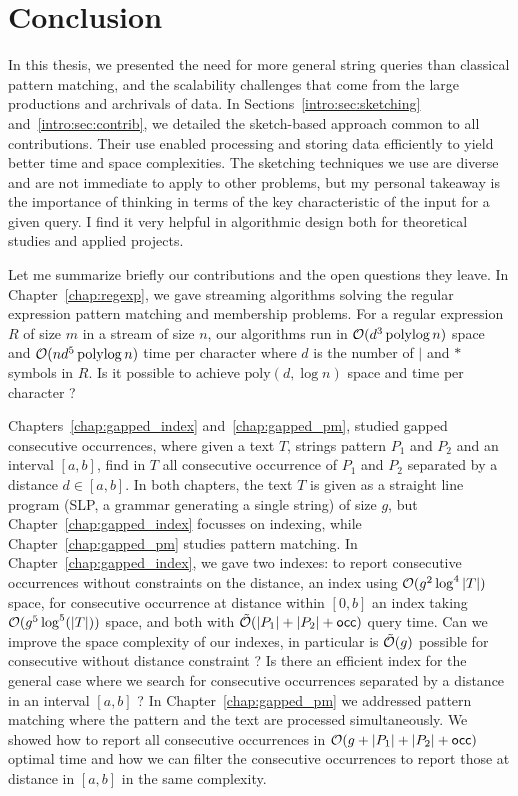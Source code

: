 \clearemptydoublepage
{}
\chapter*{Conclusion}
In this thesis, we presented the need for more general string queries than classical pattern matching, and the scalability challenges that come from the large productions and archrivals of data.
%
In Sections~\ref*{intro:sec:sketching} and~\ref*{intro:sec:contrib}, we detailed the sketch-based approach common to all contributions. Their use enabled processing and storing data efficiently to yield better time and space complexities.
%
The sketching techniques we use are diverse and are not immediate to apply to other problems, but my personal takeaway is the importance of thinking in terms of the key characteristic of the input for a given query. I find it very helpful in algorithmic design both for theoretical studies and applied projects.


Let me summarize briefly our contributions and the open questions they leave. 
In Chapter~\ref{chap:regexp}, we gave streaming algorithms solving the regular expression pattern matching and membership problems. For a regular expression $R$ of size $m$ in a stream of size $n$, our algorithms run in $\mathcal{O}(d^3 \operatorname{polylog} n)$ space and $\mathcal{O}(nd^5\operatorname{polylog} n)$ time per character where $d$ is the number of $|$ and $\ast$ symbols in $R$. Is it possible to achieve $\mathrm{poly}(d,\log n)$ space and time per character ?

Chapters~\ref{chap:gapped_index} and~\ref{chap:gapped_pm}, studied gapped consecutive occurrences, where given a text $T$, strings pattern $P_1$ and $P_2$ and an interval $[a,b]$, find in $T$ all consecutive occurrence of $P_1$ and $P_2$ separated by a distance $d \in [a,b]$. In both chapters, the text $T$ is given as a straight line program (SLP, a grammar generating a single string) of size $g$, but Chapter~\ref{chap:gapped_index} focusses on indexing, while Chapter~\ref{chap:gapped_pm} studies pattern matching. In Chapter~\ref{chap:gapped_index}, we gave two indexes: to report consecutive occurrences without constraints on the distance, an index using $\mathcal{O}(g^2\log^4|T|)$ space, for consecutive occurrence at distance within $[0,b]$ an index taking $\mathcal{O} (g^5\log^5(|T|))$ space, and both with $\tilde{\mathcal{O}}(|P_1|+|P_2|+\mathsf{occ})$ query time. 
%
Can we improve the space complexity of our indexes, in particular is $\tilde{\mathcal{O}}(g)$ possible for consecutive without distance constraint ? Is there an efficient index for the general case where we search for consecutive occurrences separated by a distance in an interval $[a,b]$ ?
%
In Chapter~\ref{chap:gapped_pm} we addressed pattern matching where the pattern and the text are processed simultaneously. We showed how to report all consecutive occurrences in $\mathcal{O}(g+|P_1|+|P_2|+\mathsf{occ})$ optimal time and how we can filter the consecutive occurrences to report those at distance in $[a,b]$ in the same complexity.


